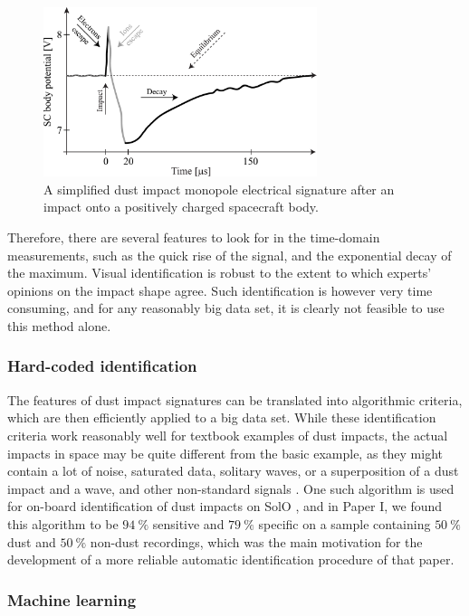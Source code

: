 \begin{figure}[h]
 	\centering
 	\includegraphics[width=8cm]{figures/impact_wf_gs.pdf}
 	\caption{A simplified dust impact monopole electrical signature after an impact onto a positively charged spacecraft body.}
 	\label{fig:impact_process}
\end{figure}

Therefore, there are several features to look for in the time-domain measurements, such as the quick rise of the signal, and the exponential decay of the maximum. Visual identification is robust to the extent to which experts' opinions on the impact shape agree. Such identification is however very time consuming, and for any reasonably big data set, it is clearly not feasible to use this method alone.

\subsubsection{Hard-coded identification}

The features of dust impact signatures can be translated into algorithmic criteria, which are then efficiently applied to a big data set. While these identification criteria work reasonably well for textbook examples of dust impacts, the actual impacts in space may be quite different from the basic example, as they might contain a lot of noise, saturated data, solitary waves, or a superposition of a dust impact and a wave, and other non-standard signals \citep{vaverka2018comparison,ye2019understanding,malaspina2023dust}. One such algorithm is used for on-board identification of dust impacts on SolO \citep{maksimovic2020solar}, and in Paper I, we found this algorithm to be $\SI{94}{\%}$ sensitive and $\SI{79}{\%}$ specific on a sample containing $\SI{50}{\%}$ dust and $\SI{50}{\%}$ non-dust recordings, which was the main motivation for the development of a more reliable automatic identification procedure of that paper. 

\subsubsection{Machine learning}

